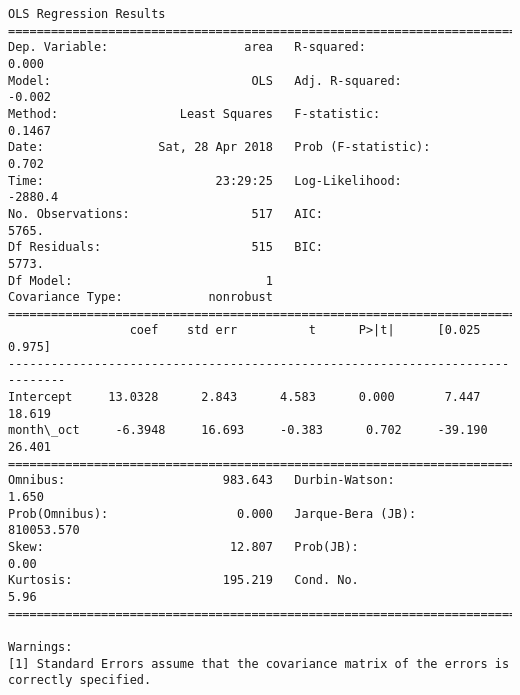 \documentclass[11pt]{article}
\begin{document}
\begin{Verbatim}[commandchars=\\\{\}]
                            OLS Regression Results                            
==============================================================================
Dep. Variable:                   area   R-squared:                       0.000
Model:                            OLS   Adj. R-squared:                 -0.002
Method:                 Least Squares   F-statistic:                    0.1467
Date:                Sat, 28 Apr 2018   Prob (F-statistic):              0.702
Time:                        23:29:25   Log-Likelihood:                -2880.4
No. Observations:                 517   AIC:                             5765.
Df Residuals:                     515   BIC:                             5773.
Df Model:                           1                                         
Covariance Type:            nonrobust                                         
==============================================================================
                 coef    std err          t      P>|t|      [0.025      0.975]
------------------------------------------------------------------------------
Intercept     13.0328      2.843      4.583      0.000       7.447      18.619
month\_oct     -6.3948     16.693     -0.383      0.702     -39.190      26.401
==============================================================================
Omnibus:                      983.643   Durbin-Watson:                   1.650
Prob(Omnibus):                  0.000   Jarque-Bera (JB):           810053.570
Skew:                          12.807   Prob(JB):                         0.00
Kurtosis:                     195.219   Cond. No.                         5.96
==============================================================================

Warnings:
[1] Standard Errors assume that the covariance matrix of the errors is correctly specified.



\end{Verbatim}
\end{document}
